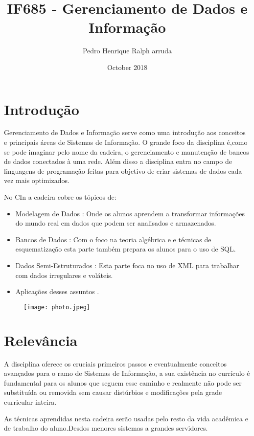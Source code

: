 \documentclass{article}
\title{IF685 - Gerenciamento de Dados e Informação}
\author{Pedro Henrique Ralph arruda }
\date{October 2018}
\begin{document}
\maketitle

\section{Introdução}
Gerenciamento  de Dados e Informação serve como uma introdução aos conceitos e principais áreas de Sistemas de Informação.
O grande foco da disciplina é,como se pode imaginar pelo nome da cadeira, o gerenciamento e manutenção de bancos de dados conectados à uma rede. 
Além disso a disciplina entra no campo de linguagens de programação feitas para objetivo de criar sistemas de dados cada vez mais optimizados. 

No CIn a cadeira cobre os tópicos de:
\begin{itemize}
\item Modelagem de Dados : Onde os alunos aprendem a transformar informações do mundo real em dados que podem ser analisados e armazenados.
\item Bancos de Dados : Com o foco na teoria algébrica e e técnicas de esquematização esta parte também prepara os alunos para o uso de SQL.
\item Dados Semi-Estruturados : Esta parte foca no uso de XML para trabalhar com dados irregulares e voláteis.
\item Aplicações desses assuntos .
\end{itemize}


\begin{figure}[h!]
\centering
\texttt{[image: photo.jpeg]}

\label{fig: https://www.pexels.com/photo/macbook-pro-on-brown-table-139387/ Licença CC0}
\end{figure}

\section{Relevância}
A disciplina oferece os cruciais primeiros passos e eventualmente conceitos avançados para o ramo de Sistemas de Informação, a sua existência no currículo é fundamental para os alunos que seguem esse caminho e realmente não pode ser substituída ou removida sem causar distúrbios e modificações pela grade curricular inteira.

As técnicas aprendidas nesta cadeira serão usadas pelo resto da vida acadêmica e de trabalho do aluno.Desdos menores sistemas a grandes servidores.
\end{document}
